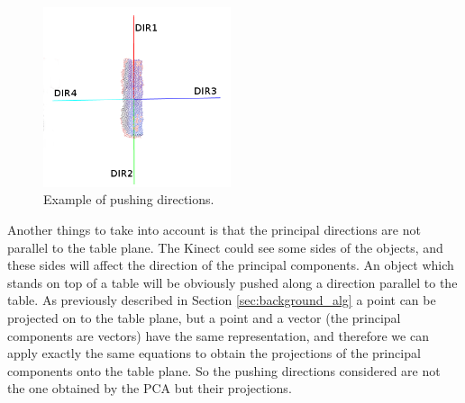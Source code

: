 \begin{figure}
\centering
\caption{Example of pushing directions.}\label{fig:directions}
\includegraphics[width=5.5cm]{Img/pushing/directions.png}
\end{figure}

Another things to take into account is that the principal directions are not parallel to the table plane. The Kinect could see some sides of the objects, and these sides will affect the direction of the principal components. An object which stands on top of a table will be obviously pushed along a direction parallel to the table. As previously described in Section \ref{sec:background_alg} a point can be projected on to the table plane, but a point and a vector (the principal components are vectors) have the same representation, and therefore we can apply exactly the same equations to obtain the projections of the principal components onto the table plane. So the pushing directions considered are not the one obtained by the PCA but their projections. 


